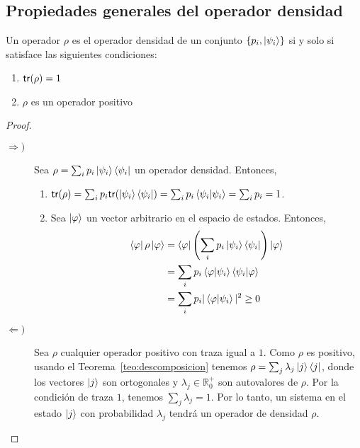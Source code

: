 \subsection{Propiedades generales del operador densidad}
\begin{teorema}
  \label{thm:CaractDens}
  Un operador $\rho$ es el operador densidad de un conjunto
  $\{p_i,\ket{\psi_i}\}$ si y solo si satisface las siguientes condiciones:
  \begin{enumerate}
  \item $\mathsf{tr}(\rho)=1$
  \item $\rho$ es un operador positivo
  \end{enumerate}
\end{teorema}
\begin{proof}
  \conlista
  \begin{description}
  \item[$\Rightarrow)$] Sea $\rho=\sum_i p_i\ket{\psi_i}\bra{\psi_i}$ un
    operador densidad. Entonces,
    \begin{enumerate}
    \item \( \mathsf{tr}(\rho) = \sum_i p_i\mathsf{tr}(\ket{\psi_i}\bra{\psi_i})= \sum_i p_i\braket{\psi_i|\psi_i}=\sum_i p_i=1
      \).
    \item Sea $\ket\varphi$ un vector arbitrario en el espacio de estados.
      Entonces,
      \begin{align*}
        \bra\varphi\rho\ket\varphi &= \bra\varphi\left(\sum_i
          p_i\ket{\psi_i}\bra{\psi_i}\right)\ket\varphi \\
          &= \sum_i
        p_i\braket{\varphi|\psi_i}\braket{\psi_i|\varphi} \\
        &=\sum_i
        p_i|\braket{\varphi|\psi_i}|^2 \geq 0
      \end{align*}
    \end{enumerate}
  \item[$\Leftarrow)$] Sea $\rho$ cualquier operador positivo con traza igual a
    $1$. Como $\rho$ es positivo, usando el Teorema~\ref{teo:descomposicion} tenemos
    \( \rho=\sum_j\lambda_j\ket j\bra j \), donde los vectores $\ket j$ son
    ortogonales y $\lambda_j\in\mathbb R^+_0$ son autovalores de $\rho$. Por la
    condición de traza $1$, tenemos $\sum_j\lambda_j=1$. Por lo tanto, un
    sistema en el estado $\ket j$ con probabilidad $\lambda_j$ tendrá un
    operador de densidad $\rho$. \qedhere
  \end{description}
\end{proof}

